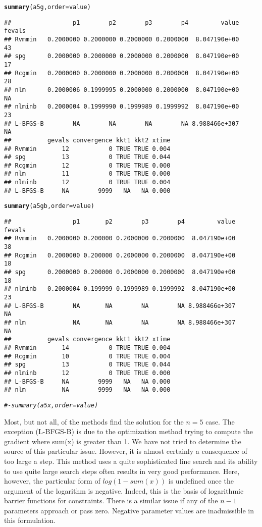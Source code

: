 \documentclass[11pt]{article}\usepackage[]{graphicx}\usepackage[]{color}
\makeatletter
\newcommand{\hlcom}[1]{\textcolor[rgb]{0.678,0.584,0.686}{\textit{#1}}}%
\newcommand{\hlstd}[1]{\textcolor[rgb]{0.345,0.345,0.345}{#1}}%
\newcommand{\hlkwc}[1]{\textcolor[rgb]{0.333,0.667,0.333}{#1}}%
\newcommand{\hlkwd}[1]{\textcolor[rgb]{0.737,0.353,0.396}{\textbf{#1}}}%
\newenvironment{kframe}{%
 \def\at@end@of@kframe{}%
 \ifinner\ifhmode%
  \def\at@end@of@kframe{\end{minipage}}%
  \begin{minipage}{\columnwidth}%
 \fi\fi%
 \def\FrameCommand##1{\hskip\@totalleftmargin \hskip-\fboxsep
 \colorbox{shadecolor}{##1}\hskip-\fboxsep
     \hskip-\linewidth \hskip-\@totalleftmargin \hskip\columnwidth}%
 \MakeFramed {\advance\hsize-\width
   \@totalleftmargin\z@ \linewidth\hsize
   \@setminipage}}%
 {\par\unskip\endMakeFramed%
 \at@end@of@kframe}
\newenvironment{knitrout}{}{} %
\makeatother
\begin{document}
\begin{knitrout}
\begin{kframe}
\begin{alltt}
\hlkwd{summary}\hlstd{(a5g,}\hlkwc{order}\hlstd{=value)}
\end{alltt}
\begin{verbatim}
##                 p1        p2        p3        p4         value fevals
## Rvmmin   0.2000000 0.2000000 0.2000000 0.2000000  8.047190e+00     43
## spg      0.2000000 0.2000000 0.2000000 0.2000000  8.047190e+00     17
## Rcgmin   0.2000000 0.2000000 0.2000000 0.2000000  8.047190e+00     28
## nlm      0.2000006 0.1999995 0.2000000 0.2000000  8.047190e+00     NA
## nlminb   0.2000004 0.1999990 0.1999989 0.1999992  8.047190e+00     23
## L-BFGS-B        NA        NA        NA        NA 8.988466e+307     NA
##          gevals convergence kkt1 kkt2 xtime
## Rvmmin       12           0 TRUE TRUE 0.004
## spg          13           0 TRUE TRUE 0.044
## Rcgmin       12           0 TRUE TRUE 0.000
## nlm          11           0 TRUE TRUE 0.000
## nlminb       12           0 TRUE TRUE 0.004
## L-BFGS-B     NA        9999   NA   NA 0.000
\end{verbatim}
\begin{alltt}
\hlkwd{summary}\hlstd{(a5gb,}\hlkwc{order}\hlstd{=value)}
\end{alltt}
\begin{verbatim}
##                 p1       p2        p3        p4         value fevals
## Rvmmin   0.2000000 0.200000 0.2000000 0.2000000  8.047190e+00     38
## Rcgmin   0.2000000 0.200000 0.2000000 0.2000000  8.047190e+00     18
## spg      0.2000000 0.200000 0.2000000 0.2000000  8.047190e+00     18
## nlminb   0.2000004 0.199999 0.1999989 0.1999992  8.047190e+00     23
## L-BFGS-B        NA       NA        NA        NA 8.988466e+307     NA
## nlm             NA       NA        NA        NA 8.988466e+307     NA
##          gevals convergence kkt1 kkt2 xtime
## Rvmmin       14           0 TRUE TRUE 0.004
## Rcgmin       10           0 TRUE TRUE 0.004
## spg          13           0 TRUE TRUE 0.044
## nlminb       12           0 TRUE TRUE 0.000
## L-BFGS-B     NA        9999   NA   NA 0.000
## nlm          NA        9999   NA   NA 0.000
\end{verbatim}
\begin{alltt}
\hlcom{#- summary(a5x,order=value)}
\end{alltt}
\end{kframe}
\end{knitrout}

Most, but not all, of the methods find the solution for the $n=5$ case. 
The exception (L-BFGS-B) is due to the optimization method trying to 
compute the gradient where sum(x) is greater than 1. We 
have not tried to determine the source of this particular issue. However, 
it is almost certainly 
a consequence of too large a step. This method uses a quite sophisticated
line search and its ability to use quite large search steps often results in
very good performance. Here, however, the particular form of $log(1-sum(x))$ 
is undefined once the argument of
the logarithm is negative. Indeed, this is the basis of 
logarithmic barrier functions for constraints. There
is a similar issue if any of the $n-1$ parameters approach or pass zero. Negative 
parameter values are inadmissible in this formulation. 
\end{document}
